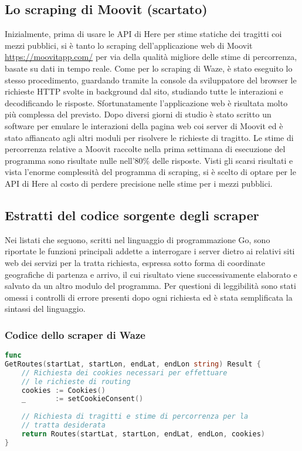 \subsection{Lo scraping di Moovit (scartato)}

Inizialmente, prima di usare le API di Here per stime statiche dei tragitti coi mezzi pubblici, si è tanto lo scraping dell'applicazione web di Moovit \url{https://moovitapp.com/} per via della qualità migliore delle stime di percorrenza, basate su dati in tempo reale. Come per lo scraping di Waze, è stato eseguito lo stesso procedimento, guardando tramite la console da sviluppatore del browser le richieste HTTP svolte in background dal sito, studiando tutte le interazioni e decodificando le risposte. Sfortunatamente l'applicazione web è risultata molto più complessa del previsto. Dopo diversi giorni di studio è stato scritto un software per emulare le interazioni della pagina web coi server di Moovit ed è stato affiancato agli altri moduli per risolvere le richieste di tragitto. Le stime di percorrenza relative a Moovit raccolte nella prima settimana di esecuzione del programma sono risultate nulle nell'80\% delle risposte. Visti gli scarsi risultati e vista l'enorme complessità del programma di scraping, si è scelto di optare per le API di Here al costo di perdere precisione nelle stime per i mezzi pubblici.

\subsection{Estratti del codice sorgente degli scraper}

Nei listati che seguono, scritti nel linguaggio di programmazione Go, sono riportate le funzioni principali addette a interrogare i server dietro ai relativi siti web dei servizi per la tratta richiesta, espressa sotto forma di coordinate geografiche di partenza e arrivo, il cui risultato viene successivamente elaborato e salvato da un altro modulo del programma. Per questioni di leggibilità sono stati omessi i controlli di errore presenti dopo ogni richiesta ed è stata semplificata la sintassi del linguaggio.

\newpage
\subsubsection{Codice dello scraper di Waze}

\begin{lstlisting}[language=Go]
func
GetRoutes(startLat, startLon, endLat, endLon string) Result {
	// Richiesta dei cookies necessari per effettuare
	// le richieste di routing
	cookies := Cookies()
	_       := setCookieConsent()
	
	// Richiesta di tragitti e stime di percorrenza per la
	// tratta desiderata
	return Routes(startLat, startLon, endLat, endLon, cookies)
}
\end{lstlisting}

